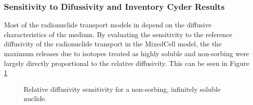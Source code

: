 
\subsubsection{Sensitivity to Difussivity and Inventory Cyder Results}
Most of the radionuclide transport models in \Cyder depend on the diffusive 
characteristics of the medium. By evaluating the sensitivity to the reference 
diffusivity of the radionuclide transport in the MixedCell model, the 
the maximum releases due to isotopes treated as highly soluble and non-sorbing
were largely directly proportional to the relative diffusivity. 
This can be seen in Figure \ref{fig:mixed_diff} 
\begin{figure}[ht]
\centering
\caption{Relative diffusivity sensitivity for a non-sorbing, infinitely soluble 
nuclide.}
\label{fig:mixed_diff}
\end{figure}
